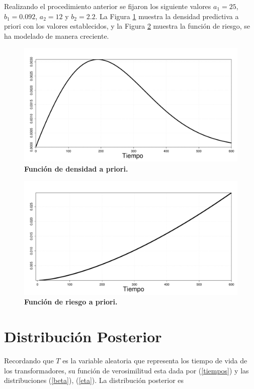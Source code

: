 \noindent Realizando el procedimiento anterior se fijaron los siguiente valores
$a_1=25$,  $b_1 =0.092$, $a_2=12$ y  $b_2 =2.2$. La Figura \ref{risk1} muestra la densidad predictiva a priori  con los valores establecidos, y la Figura \ref{risk2} muestra la funci\'on de riesgo, se ha modelado de manera creciente. 

\begin{figure}
\centering
\includegraphics[scale=0.2]{app.pdf}
\vspace{-0.5cm}\caption{{\bf Funci\'on de densidad a priori.}\label{risk1}}
\end{figure}


\begin{figure}
\centering
\includegraphics[scale=0.2]{r2meses.pdf}
\vspace{-0.5cm}\caption{{\bf Funci\'on de riesgo a priori.}\label{risk2}}
\end{figure}

\section{Distribuci\'on  Posterior}
\noindent Recordando que  $T$ es la variable aleatoria que representa los tiempo de vida de los transformadores, su funci\'on de verosimilitud esta dada por (\ref{tiempos}) y las distribuciones (\ref{beta}), (\ref{eta}). 
La distribuci\'on posterior es 

